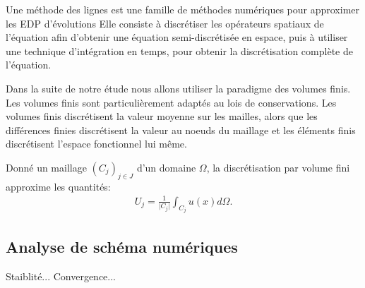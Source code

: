 \begin{definition}
    Une méthode des lignes est une famille de méthodes numériques pour approximer les EDP d'évolutions
    Elle consiste à discrétiser les opérateurs spatiaux de l'équation afin d'obtenir une équation semi-discrétisée en espace,
    puis à utiliser une technique d'intégration en temps, pour obtenir la discrétisation complète de l'équation.
\end{definition}

\begin{definition}
\end{definition}

Dans la suite de notre étude nous allons utiliser la paradigme des volumes finis.
Les volumes finis sont particulièrement adaptés au lois de conservations.
Les volumes finis discrétisent la valeur moyenne sur les mailles, alors que les différences finies discrétisent la valeur au noeuds du maillage et 
les éléments finis discrétisent l'espace fonctionnel lui même.
\begin{definition}
    Donné un maillage $(C_j)_{j\in J}$ d'un domaine $\Omega$, la discrétisation par volume fini approxime les quantités:
    \begin{align}
        U_j = \frac{1}{\vert C_j \vert} \int_{C_j} u(x) d\Omega.
    \end{align}
\end{definition}
\subsection{Analyse de schéma numériques}
Staiblité... Convergence...
\begin{definition}
\end{definition}
\begin{definition}
\end{definition}